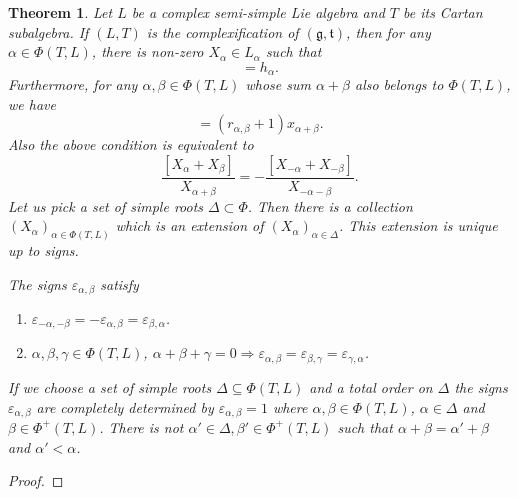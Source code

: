 \documentclass{article}
\newtheorem{theorem}{Theorem}[section]
\numberwithin{equation}{section}
\begin{document}
\begin{theorem}
Let $L$ be a complex semi-simple Lie algebra and $T$ be its Cartan subalgebra. If $(L,T)$ is the complexification of $(\mathfrak{g},\mathfrak{t})$, then for any $\alpha\in\Phi(T,L)$, there is non-zero $X_\alpha\in L_\alpha$ such that 
\begin{equation*}
[X_\alpha,X_{-\alpha}] = h_\alpha.
\end{equation*}
Furthermore, for any $\alpha,\beta\in \Phi(T,L)$ whose sum $\alpha+\beta$ also belongs to $\Phi(T,L)$, we have
\begin{equation*}
[X_\alpha,X_\beta] = (r_{\alpha,\beta}+1)x_{\alpha+\beta}.
\end{equation*}
Also the above condition is equivalent to 
\begin{equation*}
{\frac {[X_\alpha+X_\beta]} {X_{\alpha+\beta}}}=-{\frac {[X_{-\alpha}+X_{-\beta}]} {X_{-\alpha-\beta}}}.
\end{equation*}
Let us pick a set of simple roots $\Delta\subset\Phi$. Then there is a collection $(X_\alpha)_{\alpha\in\Phi(T,L)}$ which is an extension of $(X_\alpha)_{\alpha\in\Delta}$. This extension is unique up to signs.\\
\par The signs $\varepsilon_{\alpha,\beta}$ satisfy
\begin{enumerate}
\item $\varepsilon_{-\alpha,-\beta} = -\varepsilon_{\alpha,\beta}=\varepsilon_{\beta,\alpha}$.
\item $\alpha,\beta,\gamma\in \Phi(T,L)$, $\alpha+\beta+\gamma=0\Rightarrow \varepsilon_{\alpha,\beta}=\varepsilon_{\beta,\gamma}=\varepsilon_{\gamma,\alpha}$.
\end{enumerate}

If we choose a set of simple roots $\Delta\subseteq\Phi(T,L)$ and a total order on $\Delta$ the signs $\varepsilon_{\alpha,\beta}$ are completely determined by $\varepsilon_{\alpha,\beta}=1$ where $\alpha,\beta\in\Phi(T,L)$, $\alpha\in\Delta$ and $\beta\in \Phi^+(T,L)$. There is not $\alpha'\in\Delta,\beta'\in\Phi^+(T,L)$ such that $\alpha+\beta=\alpha'+\beta$ and $\alpha'<\alpha$.
\end{theorem}

\begin{proof}
\end{proof}
\end{document}
